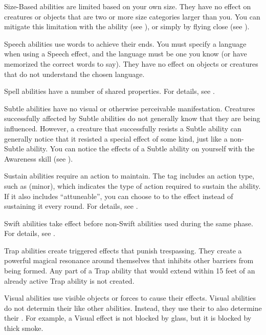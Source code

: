    Size-Based abilities are limited based on your own size.
  They have no effect on creatures or objects that are two or more size categories larger than you.
  You can mitigate this limitation with the  ability (see ), or simply by flying close (see ).

   Speech abilities use words to achieve their ends.
  You must specify a language when using a Speech effect, and the language must be one you know (or have memorized the correct words to say). They have no effect on objects or creatures that do not understand the chosen language.

   Spell abilities have a number of shared properties.
  For details, see .

   Subtle abilities have no visual or otherwise perceivable manifestation.
  Creatures successfully affected by Subtle abilities do not generally know that they are being influenced.
  However, a creature that successfully resists a Subtle ability can generally notice that it resisted a special effect of some kind, just like a non-Subtle ability.
  You can notice the effects of a Subtle ability on yourself with the Awareness skill (see ).

   Sustain abilities require an action to maintain.
  The tag includes an action type, such as (minor), which indicates the type of action required to sustain the ability.
  If it also includes ``attuneable'', you can choose to  to the effect instead of sustaining it every round.
  For details, see .

   Swift abilities take effect before non-Swift abilities used during the same phase.
  For details, see .

   Trap abilities create triggered effects that punish trespassing.
  They create a powerful magical resonance around themselves that inhibits other barriers from being formed.
  Any part of a Trap ability that would extend within 15 feet of an already active Trap ability is not created.

   Visual abilities use visible objects or forces to cause their effects.
  Visual abilities do not determin their  like other abilities.
  Instead, they use their  to also determine their .
  For example, a Visual effect is not blocked by glass, but it is blocked by thick smoke.

